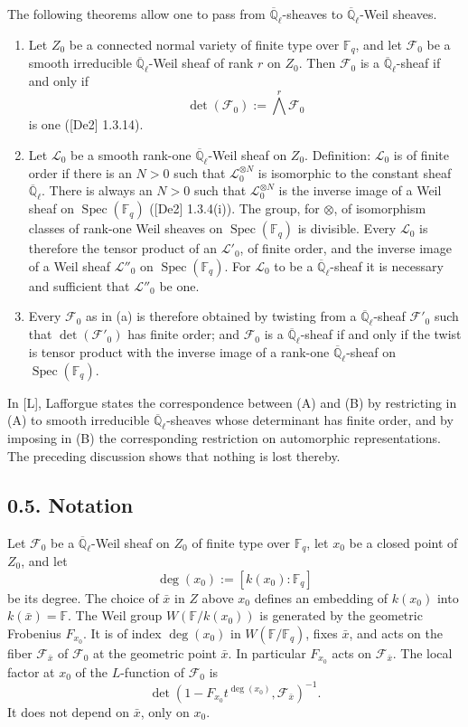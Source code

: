 \documentclass[10pt]{article}
\newcommand{\F}{\mathbb{F}}
\newcommand{\Ql}{\overline{\mathbb Q}_{\ell}}
\newcommand{\Spec}{\operatorname{Spec}}
\begin{document}
The following theorems allow one to pass from $\Ql$-sheaves to $\Ql$-Weil sheaves.
\begin{enumerate}[label=(\alph*)]
\item Let $Z_0$ be a connected normal variety of finite type over $\F_q$, and let $\mathcal F_0$ be a smooth irreducible $\Ql$-Weil sheaf of rank $r$ on $Z_0$. Then $\mathcal F_0$ is a $\Ql$-sheaf if and only if
\[
 \det(\mathcal F_0):=\bigwedge^r\mathcal F_0
\]
is one ([De2] 1.3.14).
\item Let $\mathcal L_0$ be a smooth rank-one $\Ql$-Weil sheaf on $Z_0$. Definition: $\mathcal L_0$ is of finite order if there is an $N>0$ such that $\mathcal L_0^{\otimes N}$ is isomorphic to the constant sheaf $\Ql$. There is always an $N>0$ such that $\mathcal L_0^{\otimes N}$ is the inverse image of a Weil sheaf on $\Spec(\F_q)$ ([De2] 1.3.4(i)). The group, for $\otimes$, of isomorphism classes of rank-one Weil sheaves on $\Spec(\F_q)$ is divisible. Every $\mathcal L_0$ is therefore the tensor product of an $\mathcal L'_0$, of finite order, and the inverse image of a Weil sheaf $\mathcal L''_0$ on $\Spec(\F_q)$. For $\mathcal L_0$ to be a $\Ql$-sheaf it is necessary and sufficient that $\mathcal L''_0$ be one.
\item Every $\mathcal F_0$ as in (a) is therefore obtained by twisting from a $\Ql$-sheaf $\mathcal F'_0$ such that $\det(\mathcal F'_0)$ has finite order; and $\mathcal F_0$ is a $\Ql$-sheaf if and only if the twist is tensor product with the inverse image of a rank-one $\Ql$-sheaf on $\Spec(\F_q)$.
\end{enumerate}
In [L], Lafforgue states the correspondence between (A) and (B) by restricting in (A) to smooth irreducible $\Ql$-sheaves whose determinant has finite order, and by imposing in (B) the corresponding restriction on automorphic representations.
The preceding discussion shows that nothing is lost thereby.

\subsection*{0.5. Notation}
Let $\mathcal F_0$ be a $\Ql$-Weil sheaf on $Z_0$ of finite type over $\F_q$, let $x_0$ be a closed point of $Z_0$, and let
\[
 \deg(x_0):=[k(x_0):\F_q]
\]
be its degree.
The choice of $\bar x$ in $Z$ above $x_0$ defines an embedding of $k(x_0)$ into $k(\bar x)=\F$.
The Weil group $W(\F/k(x_0))$ is generated by the geometric Frobenius $F_{x_0}$.
It is of index $\deg(x_0)$ in $W(\F/\F_q)$, fixes $\bar x$, and acts on the fiber $\mathcal F_{\bar x}$ of $\mathcal F_0$ at the geometric point $\bar x$.
In particular $F_{x_0}$ acts on $\mathcal F_{\bar x}$.
The local factor at $x_0$ of the $L$-function of $\mathcal F_0$ is
\begin{equation}
\det\left(1-F_{x_0}t^{\deg(x_0)},\mathcal F_{\bar x}\right)^{-1}.
\tag{0.5.1}
\end{equation}
It does not depend on $\bar x$, only on $x_0$.
\end{document}
